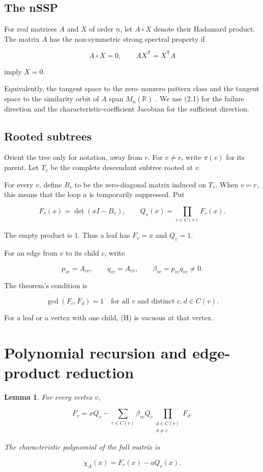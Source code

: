 \documentclass[11pt]{article}
\newtheorem{lemma}[theorem]{Lemma}
\theoremstyle{remark}
\begin{document}
\subsection*{The nSSP}


For real matrices $A$ and $X$ of order $n$, let $A\circ X$ denote their Hadamard product. The matrix $A$ has the non-symmetric strong spectral property if

\[
A\circ X=0,
\qquad
AX^{\mathsf T}=X^{\mathsf T}A
\tag{2.1}
\]

imply $X=0$.

Equivalently, the tangent space to the zero--nonzero pattern class and the tangent space to the similarity orbit of $A$ span $M_n(\mathbb R)$ \cite{ref1,ref2}. We use (2.1) for the failure direction and the characteristic-coefficient Jacobian for the sufficient direction.

\subsection*{Rooted subtrees}


Orient the tree only for notation, away from $r$. For $v\ne r$, write $\pi(v)$ for its parent. Let $T_v$ be the complete descendant subtree rooted at $v$.

For every $v$, define $B_v$ to be the zero-diagonal matrix induced on $T_v$. When $v=r$, this means that the loop $a$ is temporarily suppressed. Put

\[
F_v(x)=\det(xI-B_v),
\qquad
Q_v(x)=\prod_{c\in C(v)}F_c(x).
\tag{2.2}
\]

The empty product is $1$. Thus a leaf has $F_v=x$ and $Q_v=1$.

For an edge from $v$ to its child $c$, write

\[
p_{vc}=A_{vc},
\qquad
q_{vc}=A_{cv},
\qquad
\beta_{vc}=p_{vc}q_{vc}\ne0.
\tag{2.3}
\]

The theorem's condition is

\[
\gcd(F_c,F_d)=1
\quad\text{for all }v\text{ and distinct }c,d\in C(v).
\tag{H}
\]

For a leaf or a vertex with one child, (H) is vacuous at that vertex.

\section{Polynomial recursion and edge-product reduction}


\begin{lemma}

For every vertex $v$,

\[
F_v
=xQ_v-
\sum_{c\in C(v)}
\beta_{vc}Q_c\prod_{\substack{d\in C(v)\\d\ne c}}F_d.
\tag{3.1}
\]

The characteristic polynomial of the full matrix is

\[
\chi_A(x)=F_r(x)-aQ_r(x).
\tag{3.2}
\]

\end{lemma}
\end{document}
